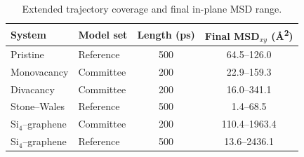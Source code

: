 \begin{table}[!htbp]
  \centering
  \small
  \caption{Extended trajectory coverage and final in-plane MSD range.}
  \label{tab:si_md_runs}
  \begin{tabular}{llcc}
    \toprule
    System & Model set & Length (ps) & Final MSD$_{xy}$ (\si{\angstrom\squared}) \\
    \midrule
    Pristine & Reference & 500 & 64.5--126.0 \\
    Monovacancy & Committee & 200 & 22.9--159.3 \\
    Divacancy & Committee & 200 & 16.0--341.1 \\
    Stone--Wales & Reference & 500 & 1.4--68.5 \\
    Si$_4$--graphene & Committee & 200 & 110.4--1963.4 \\
    Si$_4$--graphene & Reference & 500 & 13.6--2436.1 \\
    \bottomrule
  \end{tabular}
\end{table}
